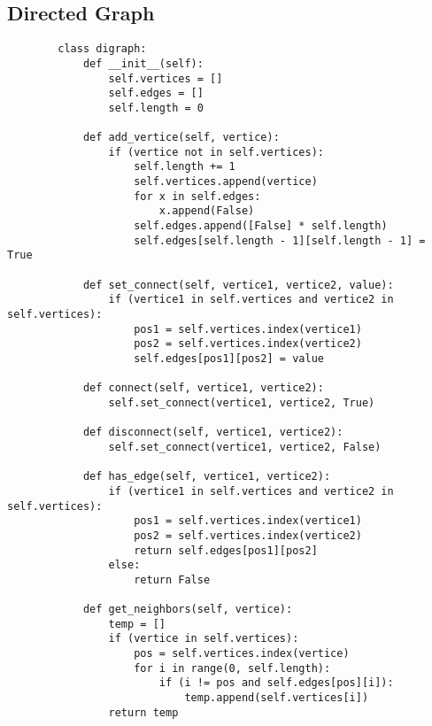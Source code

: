     \newpage





\subsection{ Directed Graph }

    \begin{lstlisting}
        class digraph:
            def __init__(self):
                self.vertices = []
                self.edges = []
                self.length = 0

            def add_vertice(self, vertice):
                if (vertice not in self.vertices):
                    self.length += 1
                    self.vertices.append(vertice)
                    for x in self.edges:
                        x.append(False)
                    self.edges.append([False] * self.length)
                    self.edges[self.length - 1][self.length - 1] = True    

            def set_connect(self, vertice1, vertice2, value):
                if (vertice1 in self.vertices and vertice2 in self.vertices):
                    pos1 = self.vertices.index(vertice1)
                    pos2 = self.vertices.index(vertice2)
                    self.edges[pos1][pos2] = value
                    
            def connect(self, vertice1, vertice2):
                self.set_connect(vertice1, vertice2, True)
                
            def disconnect(self, vertice1, vertice2):
                self.set_connect(vertice1, vertice2, False)
                
            def has_edge(self, vertice1, vertice2):
                if (vertice1 in self.vertices and vertice2 in self.vertices):
                    pos1 = self.vertices.index(vertice1)
                    pos2 = self.vertices.index(vertice2)
                    return self.edges[pos1][pos2] 
                else:
                    return False
                
            def get_neighbors(self, vertice):
                temp = []
                if (vertice in self.vertices):
                    pos = self.vertices.index(vertice)
                    for i in range(0, self.length):
                        if (i != pos and self.edges[pos][i]):
                            temp.append(self.vertices[i])
                return temp
    \end{lstlisting}

